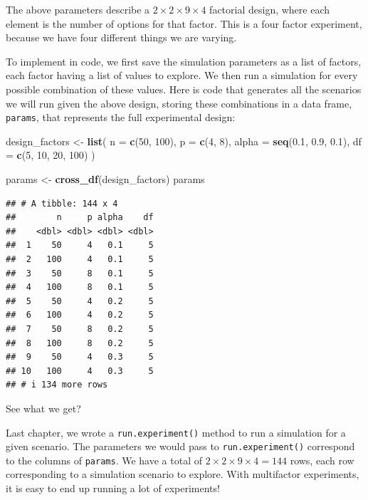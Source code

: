 \documentclass[
]{book}
\newenvironment{Shaded}{\begin{snugshade}}{\end{snugshade}}
\newcommand{\AttributeTok}[1]{\textcolor[rgb]{0.13,0.29,0.53}{#1}}
\newcommand{\DecValTok}[1]{\textcolor[rgb]{0.00,0.00,0.81}{#1}}
\newcommand{\FloatTok}[1]{\textcolor[rgb]{0.00,0.00,0.81}{#1}}
\newcommand{\FunctionTok}[1]{\textcolor[rgb]{0.13,0.29,0.53}{\textbf{#1}}}
\newcommand{\NormalTok}[1]{#1}
\newcommand{\OtherTok}[1]{\textcolor[rgb]{0.56,0.35,0.01}{#1}}
\begin{document}
The above parameters describe a \(2 \times 2 \times 9 \times 4\) factorial design, where each element is the number of options for that factor. This is a four factor experiment, because we have four different things we are varying.

To implement in code, we first save the simulation parameters as a list of factors, each factor having a list of values to explore.
We then run a simulation for every possible combination of these values.
Here is code that generates all the scenarios we will run given the above design, storing these combinations in a data frame, \texttt{params}, that represents the full experimental design:

\begin{Shaded}
\begin{Highlighting}[]
\NormalTok{design\_factors }\OtherTok{\textless{}{-}} \FunctionTok{list}\NormalTok{(}
  \AttributeTok{n =} \FunctionTok{c}\NormalTok{(}\DecValTok{50}\NormalTok{, }\DecValTok{100}\NormalTok{),}
  \AttributeTok{p =} \FunctionTok{c}\NormalTok{(}\DecValTok{4}\NormalTok{, }\DecValTok{8}\NormalTok{),}
  \AttributeTok{alpha =} \FunctionTok{seq}\NormalTok{(}\FloatTok{0.1}\NormalTok{, }\FloatTok{0.9}\NormalTok{, }\FloatTok{0.1}\NormalTok{),}
  \AttributeTok{df =} \FunctionTok{c}\NormalTok{(}\DecValTok{5}\NormalTok{, }\DecValTok{10}\NormalTok{, }\DecValTok{20}\NormalTok{, }\DecValTok{100}\NormalTok{)}
\NormalTok{)}

\NormalTok{params }\OtherTok{\textless{}{-}} \FunctionTok{cross\_df}\NormalTok{(design\_factors)}
\NormalTok{params}
\end{Highlighting}
\end{Shaded}

\begin{verbatim}
## # A tibble: 144 x 4
##        n     p alpha    df
##    <dbl> <dbl> <dbl> <dbl>
##  1    50     4   0.1     5
##  2   100     4   0.1     5
##  3    50     8   0.1     5
##  4   100     8   0.1     5
##  5    50     4   0.2     5
##  6   100     4   0.2     5
##  7    50     8   0.2     5
##  8   100     8   0.2     5
##  9    50     4   0.3     5
## 10   100     4   0.3     5
## # i 134 more rows
\end{verbatim}

See what we get?

Last chapter, we wrote a \texttt{run.experiment()} method to run a simulation for a given scenario.
The parameters we would pass to \texttt{run.experiment()} correspond to the columns of \texttt{params}.
We have a total of \(2 \times 2 \times 9 \times 4 = 144\) rows, each row corresponding to a simulation scenario to explore.
With multifactor experiments, it is easy to end up running a lot of experiments!
\end{document}
